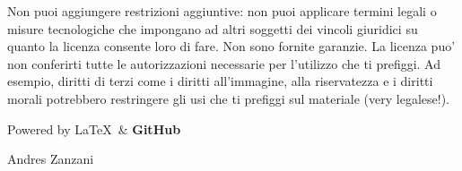 \documentclass[a4paper,11pt,twoside,openany]{dndbook}
\begin{document}
\bigskip
Non puoi aggiungere restrizioni aggiuntive: non puoi applicare termini legali o misure tecnologiche che impongano ad altri soggetti dei vincoli giuridici su quanto la licenza consente loro di fare. Non sono fornite garanzie. La licenza puo' non conferirti tutte le autorizzazioni necessarie per l'utilizzo che ti prefiggi. Ad esempio, diritti di terzi come i diritti all'immagine, alla riservatezza e i diritti morali potrebbero restringere gli usi che ti prefiggi sul materiale (very legalese!).

\bigskip

Powered by \Large\LaTeX\ \normalfont\& \Large\textbf{GitHub}

\bigskip

Andres Zanzani


\normalsize

\pagebreak
\end{document}
